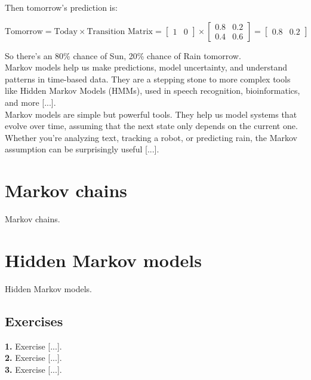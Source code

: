\documentclass{book}
\begin{document}
Then tomorrow’s prediction is:

\[
\text{Tomorrow} = \text{Today} \times \text{Transition Matrix} = 
\begin{bmatrix} 1 & 0 \end{bmatrix} \times
\begin{bmatrix}
0.8 & 0.2 \\
0.4 & 0.6
\end{bmatrix}
=
\begin{bmatrix}
0.8 & 0.2
\end{bmatrix}
\]

So there's an 80\% chance of Sun, 20\% chance of Rain tomorrow.\\

Markov models help us make predictions, model uncertainty, and understand patterns in time-based data. They are a stepping stone to more complex tools like Hidden Markov Models (HMMs), used in speech recognition, bioinformatics, and more [...].\\

Markov models are simple but powerful tools. They help us model systems that evolve over time, assuming that the next state only depends on the current one. Whether you’re analyzing text, tracking a robot, or predicting rain, the Markov assumption can be surprisingly useful [...].

\newpage

\section{Markov chains}
Markov chains.

\newpage

\section{Hidden Markov models}
Hidden Markov models.

\newpage

\subsection*{Exercises}

\textbf{1.} Exercise [...].\\

\textbf{2.} Exercise [...].\\

\textbf{3.} Exercise [...].\\
\end{document}
